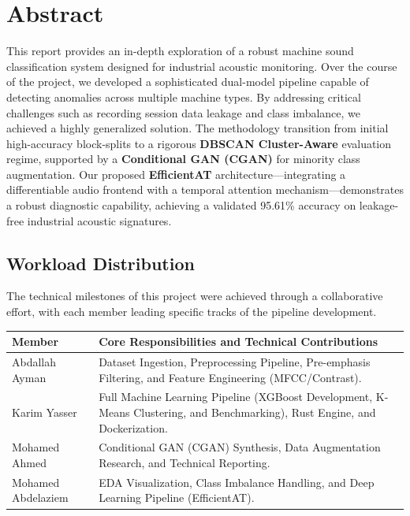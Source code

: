 \documentclass[10pt,a4paper,oneside]{extbook}
\begin{document}
\frontmatter
\tableofcontents

\chapter*{Abstract}
This report provides an in-depth exploration of a robust machine sound classification system designed for industrial acoustic monitoring. Over the course of the project, we developed a sophisticated dual-model pipeline capable of detecting anomalies across multiple machine types. By addressing critical challenges such as recording session data leakage and class imbalance, we achieved a highly generalized solution. The methodology transition from initial high-accuracy block-splits to a rigorous \textbf{DBSCAN Cluster-Aware} evaluation regime, supported by a \textbf{Conditional GAN (CGAN)} for minority class augmentation. Our proposed \textbf{EfficientAT} architecture—integrating a differentiable audio frontend with a temporal attention mechanism—demonstrates a robust diagnostic capability, achieving a validated 95.61\% accuracy on leakage-free industrial acoustic signatures.

\vspace{1.5cm}
\section*{Workload Distribution}
The technical milestones of this project were achieved through a collaborative effort, with each member leading specific tracks of the pipeline development.

\begin{center}
\renewcommand{\arraystretch}{1.4}
\begin{tabular}{@{}lp{10cm}@{}}
\toprule
\textbf{Member} & \textbf{Core Responsibilities and Technical Contributions} \\ \midrule
Abdallah Ayman & Dataset Ingestion, Preprocessing Pipeline, Pre-emphasis Filtering, and Feature Engineering (MFCC/Contrast). \\
Karim Yasser & Full Machine Learning Pipeline (XGBoost Development, K-Means Clustering, and Benchmarking), Rust Engine, and Dockerization. \\
Mohamed Ahmed & Conditional GAN (CGAN) Synthesis, Data Augmentation Research, and Technical Reporting. \\
Mohamed Abdelaziem & EDA Visualization, Class Imbalance Handling, and Deep Learning Pipeline (EfficientAT). \\ \bottomrule
\end{tabular}
\end{center}

\mainmatter












\backmatter


\end{document}
